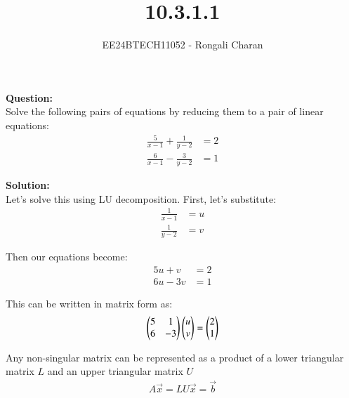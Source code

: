 \documentclass[journal]{IEEEtran}
\begin{document}

\vspace{3cm}

\title{10.3.1.1}
\author{EE24BTECH11052 - Rongali Charan}
 \maketitle
{\let\newpage\relax\maketitle}

\renewcommand{\thefigure}{\theenumi}
\renewcommand{\thetable}{\theenumi}
\setlength{\intextsep}{10pt} %


\renewcommand{\thetable}{\theenumi}


\textbf{Question:}\\
Solve the following pairs of equations by reducing them to a pair of linear equations:
\begin{align*}
    \frac{5}{x-1} + \frac{1}{y-2} &= 2\\
    \frac{6}{x-1} - \frac{3}{y-2} &= 1
\end{align*}

\textbf{Solution:}\\
Let's solve this using LU decomposition. First, let's substitute:
\begin{align}
    \frac{1}{x-1} &= u\\
    \frac{1}{y-2} &= v
\end{align}

Then our equations become:
\begin{align}
    5u + v &= 2 \label{eq1}\\
    6u - 3v &= 1 \label{eq2}
\end{align}

This can be written in matrix form as:
\begin{align}
    \begin{pmatrix}5 & 1\\6 & -3\end{pmatrix}\begin{pmatrix}u\\v\end{pmatrix} = \begin{pmatrix}2\\1\end{pmatrix}
\end{align}

Any non-singular matrix can be represented as a product of a lower triangular matrix $L$ and an upper triangular matrix $U$
\begin{align}
    A\vec{x} = LU\vec{x} = \vec{b}
\end{align}
\end{document}
